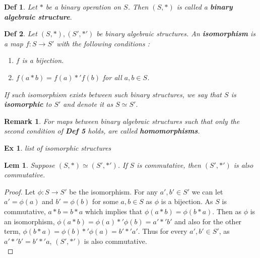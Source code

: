 \documentclass[paper=a4, fontsize=11pt]{scrartcl}
\newtheorem{definition}{Def}
\newtheorem{example}{Ex}
\newtheorem{lemma}{Lem}
\newtheorem*{remark}{Remark}
\begin{document}
\begin{definition}
	Let $\ast$ be a binary operation on $S$. Then $(S,\ast)$ is called a \textbf{binary algebraic structure}.\\
\end{definition}

\begin{definition}
	Let $(S,\ast),(S',\ast')$ be binary algebraic structures. An \textbf{isomorphism} is a map $f:S\to S'$ with the following conditions :\\
	\begin{enumerate}
		\item $f$ is a bijection.
		\item $f(a\ast b)=f(a)\ast' f(b)$ for all $a,b \in S$.\\
	\end{enumerate}
	If such isomorphism exists between such binary structures, we say that $S$ is \textbf{isomorphic} to $S'$ and denote it as $S\simeq S'$. \\
\end{definition}

\begin{remark}
	For maps between binary algebraic structures such that only the second condition of \textbf{Def 5} holds, are called \textbf{homomorphisms}.\\
\end{remark}

\begin{example}
	list of isomorphic structures \\
\end{example}

\begin{lemma}
	Suppose $(S,\ast) \simeq (S',\ast')$. If $S$ is commutative, then $(S',\ast')$ is also commutative.\\
\end{lemma}

\begin{proof}
	Let $\phi:S\to S'$ be the isomorphism. For any $a',b' \in S'$ we can let $a' = \phi(a)$ and $b'=\phi(b)$ for some $a,b \in S$ as $\phi$ is a bijection. As $S$ is commutative, $a\ast b = b \ast a$ which implies that $\phi(a \ast b) = \phi(b \ast a)$. Then as $\phi$ is an isomorphism, $\phi(a \ast b)=\phi(a) \ast' \phi(b)=a'\ast'b'$ and also for the other term, $\phi(b \ast a)=\phi(b) \ast' \phi(a)=b'\ast'a'$. Thus for every $a',b' \in S'$, as $a'\ast'b'=b'\ast'a$, $(S',\ast')$ is also commutative.\\
\end{proof}
\end{document}
